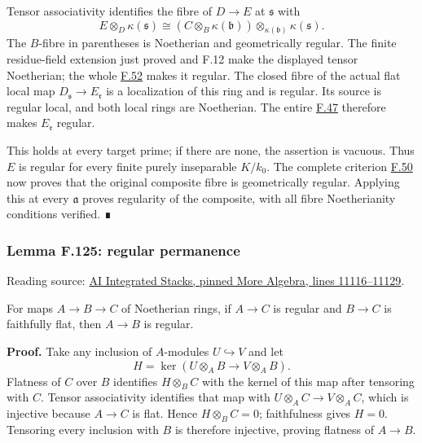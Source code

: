 \documentclass[11pt,a4paper,openany]{report}
\newcounter{none}
\begin{document}
Tensor associativity identifies the fibre of \(D\to E\) at \(\mathfrak s\) with \[
E\otimes_D\kappa(\mathfrak s)
\cong(C\otimes_B\kappa(\mathfrak b))
   \otimes_{\kappa(\mathfrak b)}\kappa(\mathfrak s).
\] The \(B\)-fibre in parentheses is Noetherian and geometrically regular. The finite residue-field extension just proved and F.12 make the displayed tensor Noetherian; the whole \hyperref[AG-RG-S05-algebra-lemma-geometrically-regular-over-subfields]{F.52} makes it regular. The closed fibre of the actual flat local map \(D_{\mathfrak s}\to E_{\mathfrak r}\) is a localization of this ring and is regular. Its source is regular local, and both local rings are Noetherian. The entire \hyperref[AG-RG-S05-algebra-lemma-flat-over-regular-with-regular-fibre]{F.47} therefore makes \(E_{\mathfrak r}\) regular.

This holds at every target prime; if there are none, the assertion is vacuous. Thus \(E\) is regular for every finite purely inseparable \(K/k_0\). The complete criterion \hyperref[AG-RG-S05-algebra-lemma-geometrically-regular]{F.50} now proves that the original composite fibre is geometrically regular. Applying this at every \(\mathfrak a\) proves regularity of the composite, with all fibre Noetherianity conditions verified. ∎

\label{AG-RG-S05-more-algebra-lemma-regular-permanence}

\subsubsection{Lemma F.125: regular permanence}\label{AG-RG-S05-lemma-f.125-regular-permanence}

Reading source: \href{https://github.com/KokunoYumeto/unofficial-stacks-project-ai-drafts/blob/565b10e987aba5969b21145a0833f42d69f96790/more-algebra.tex\#L11116-L11129}{AI Integrated Stacks, pinned More Algebra, lines 11116--11129}.

For maps \(A\to B\to C\) of Noetherian rings, if \(A\to C\) is regular and \(B\to C\) is faithfully flat, then \(A\to B\) is regular.

\textbf{Proof.} Take any inclusion of \(A\)-modules \(U\hookrightarrow V\) and let \[H=\ker(U\otimes_AB\longrightarrow V\otimes_AB).\] Flatness of \(C\) over \(B\) identifies \(H\otimes_BC\) with the kernel of this map after tensoring with \(C\). Tensor associativity identifies that map with \(U\otimes_AC\to V\otimes_AC\), which is injective because \(A\to C\) is flat. Hence \(H\otimes_BC=0\); faithfulness gives \(H=0\). Tensoring every inclusion with \(B\) is therefore injective, proving flatness of \(A\to B\).
\end{document}
